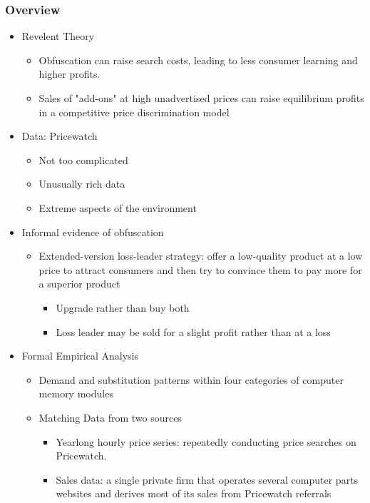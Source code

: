 \documentclass{beamer}
\begin{document}
\begin{frame}[allowframebreaks]
\frametitle{Overview}
\begin{itemize}
\item Revelent Theory
  \begin{itemize}
  \item Obfuscation can raise search costs, leading to less consumer learning
    and higher profits.
  \item Sales of "add-ons" at high unadvertised
prices can raise equilibrium profits in a competitive price discrimination model
  \end{itemize}
  
\item Data: Pricewatch
  \begin{itemize}
  \item Not too complicated
  \item Unusually rich data
  \item Extreme aspects of the environment
  \end{itemize}
  
\framebreak

\item Informal evidence of obfuscation
  \begin{itemize}
  \item Extended-version loss-leader strategy: offer a low-quality product at a low price to attract consumers and then try to convince them
to pay more for a superior product
    \begin{itemize}
    \item Upgrade rather than buy both
    \item Loss leader may be sold for a slight profit rather than at a loss
    \end{itemize}
  \end{itemize}
  
\framebreak
  
\item Formal Empirical Analysis
  \begin{itemize}
  \item Demand and substitution patterns within four categories of computer memory modules
  \item Matching Data from two sources
    \begin{itemize}
    \item Yearlong hourly price series: repeatedly conducting price searches on Pricewatch.
    \item Sales data: a single private firm that operates several computer parts websites and derives most of its sales from Pricewatch referrals
    \end{itemize}
  \end{itemize}
    

\end{itemize}
\end{frame}
\end{document}
